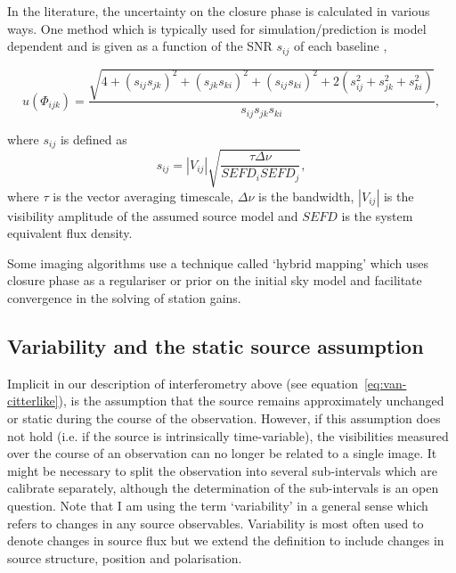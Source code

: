 In the literature, the uncertainty on the closure phase is calculated in various ways. One method which is typically used for simulation/prediction is model dependent  and is given as a function of the SNR $s_{ij}$ of each baseline \citep{Rogers_1995},

\begin{equation}\label{eq:ucp}
u(\Phi_{ijk}) = \frac{\sqrt{4 + (s_{ij}s_{jk})^2 + (s_{jk}s_{ki})^2 + (s_{ij}s_{ki})^2 +
                        2(s_{ij}^2+s_{jk}^2+s_{ki}^2)}}{s_{ij}s_{jk}s_{ki}},
\end{equation}

\noindent where $s_{ij}$ is defined as
\begin{equation}
s_{ij}=|V_{ij}| \sqrt{\frac{ \tau \Delta \nu}{SEFD_i SEFD_j}},
\end{equation}\label{eq:snr}
where $\tau$ is the vector averaging timescale, $\Delta \nu$ is the bandwidth, $|V_{ij}|$ is the visibility amplitude of the assumed source model and $SEFD$ is the system equivalent flux density.


Some imaging algorithms use a technique called `hybrid mapping' \citep[e.g.][]{Skilling_1984,Bouman_2015,Chael_2016} which uses closure phase as a regulariser or prior on the initial sky model and facilitate convergence in the solving of station gains.

\subsection{Variability and the static source assumption}\label{sec:variability}
Implicit in our description of interferometry above (see equation~\ref{eq:van-citterlike}), is the assumption that the source remains approximately unchanged or static during the course of the observation. However, if this assumption does not hold (i.e. if the source is intrinsically time-variable), the visibilities measured over the course of an observation can no longer be related to a single image. It might be necessary to split the observation into several sub-intervals which are calibrate separately, although the determination of the sub-intervals is an open question.
Note that I am using the term `variability' in a general sense which refers to changes in any source observables. Variability is most often used to denote changes in source flux but we extend the definition to include changes in source structure, position and polarisation.


